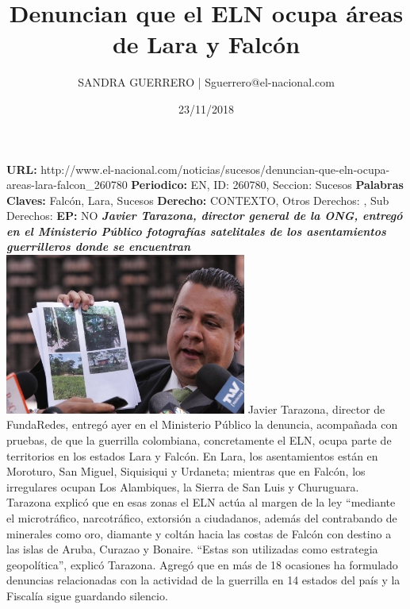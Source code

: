 \documentclass{article}%
\title{\textbf{Denuncian que el ELN ocupa áreas de Lara y Falcón}}%
\author{SANDRA GUERRERO | Sguerrero@el{-}nacional.com}%
\date{23/11/2018}%
\begin{document}
%
\normalsize%
\maketitle%
\textbf{URL: }%
http://www.el{-}nacional.com/noticias/sucesos/denuncian{-}que{-}eln{-}ocupa{-}areas{-}lara{-}falcon\_260780\newline%
%
\textbf{Periodico: }%
EN, %
ID: %
260780, %
Seccion: %
Sucesos\newline%
%
\textbf{Palabras Claves: }%
Falcón, Lara, Sucesos\newline%
%
\textbf{Derecho: }%
CONTEXTO, %
Otros Derechos: %
, %
Sub Derechos: %
\newline%
%
\textbf{EP: }%
NO\newline%
\newline%
%
\textbf{\textit{Javier Tarazona, director general de la ONG, entregó en el Ministerio Público fotografías satelitales de los asentamientos guerrilleros donde se encuentran}}%
\newline%
\newline%
%
\includegraphics[width=300px]{139.jpg}%
\newline%
%
Javier Tarazona, director de FundaRedes, entregó ayer en el Ministerio Público la denuncia, acompañada con pruebas, de que la guerrilla colombiana, concretamente el ELN, ocupa parte de territorios en los estados Lara y Falcón. En Lara, los asentamientos están en Moroturo, San Miguel, Siquisiqui y Urdaneta; mientras que en Falcón, los irregulares ocupan Los Alambiques, la Sierra de San Luis y Churuguara.%
\newline%
%
Tarazona explicó que en esas zonas el ELN actúa al margen de la ley “mediante el microtráfico, narcotráfico, extorsión a ciudadanos, además del contrabando de minerales como oro, diamante y coltán hacia las costas de Falcón con destino a las islas de Aruba, Curazao y Bonaire. “Estas son utilizadas como estrategia geopolítica”, explicó Tarazona.%
\newline%
%
Agregó que en más de 18 ocasiones ha formulado denuncias relacionadas con la actividad de la guerrilla en 14 estados del país y la Fiscalía sigue guardando silencio.%
\end{document}
